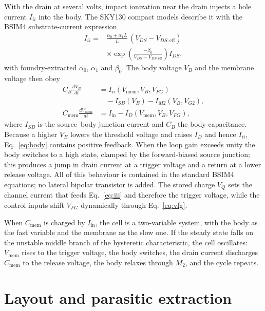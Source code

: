 \documentclass[a4paper,fleqn]{cas-dc}
\begin{document}
With the drain at several volts, impact ionization near the drain injects a hole current $I_{ii}$ into the body. The SKY130 compact models describe it with the BSIM4 substrate-current expression~\cite{bsim4}
\begin{equation}
\begin{split}
I_{ii} = {} & \frac{\alpha_0 + \alpha_1 L}{L}\,\left(V_{DS}-V_{DS,\mathrm{eff}}\right)\\
& \times \exp\!\left(\frac{-\beta_0}{V_{DS}-V_{DS,\mathrm{eff}}}\right) I_{DS},
\end{split}
\label{eq:iii}
\end{equation}
with foundry-extracted $\alpha_0$, $\alpha_1$ and $\beta_0$. The body voltage $V_B$ and the membrane voltage then obey
\begin{align}
C_B \frac{dV_B}{dt} &= I_{ii}(V_{\mathrm{mem}}, V_B, V_{FG}) \nonumber\\
 &\quad - I_{SB}(V_B) - I_{M2}(V_B, V_{G2}), \label{eq:body}\\
C_{\mathrm{mem}} \frac{dV_{\mathrm{mem}}}{dt} &= I_{\mathrm{in}} - I_{D}(V_{\mathrm{mem}}, V_B, V_{FG}), \label{eq:mem}
\end{align}
where $I_{SB}$ is the source--body junction current and $C_B$ the body capacitance. Because a higher $V_B$ lowers the threshold voltage and raises $I_D$ and hence $I_{ii}$, Eq.~\eqref{eq:body} contains positive feedback. When the loop gain exceeds unity the body switches to a high state, clamped by the forward-biased source junction; this produces a jump in drain current at a trigger voltage and a return at a lower release voltage. All of this behaviour is contained in the standard BSIM4 equations; no lateral bipolar transistor is added. The stored charge $V_Q$ sets the channel current that feeds Eq.~\eqref{eq:iii} and therefore the trigger voltage, while the control inputs shift $V_{FG}$ dynamically through Eq.~\eqref{eq:vfg}.

When $C_{\mathrm{mem}}$ is charged by $I_{\mathrm{in}}$, the cell is a two-variable system, with the body as the fast variable and the membrane as the slow one. If the steady state falls on the unstable middle branch of the hysteretic characteristic, the cell oscillates: $V_{\mathrm{mem}}$ rises to the trigger voltage, the body switches, the drain current discharges $C_{\mathrm{mem}}$ to the release voltage, the body relaxes through $M_2$, and the cycle repeats.

\section{Layout and parasitic extraction}
\label{sec:layout}
\end{document}
